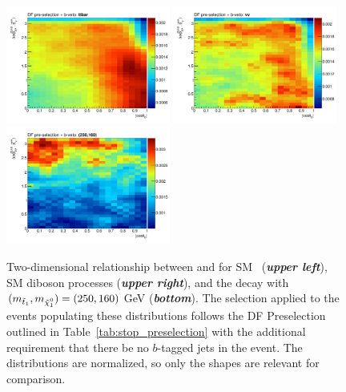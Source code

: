 \begin{figure}[!htb]
    \begin{center}
        \includegraphics[width=0.48\textwidth]{figures/search_stop2l/strategy/corr2d/wwbveto_cosThetaB_DPB_vSS_ttbar_2d}
        \includegraphics[width=0.48\textwidth]{figures/search_stop2l/strategy/corr2d/wwbveto_cosThetaB_DPB_vSS_vv_2d}
        \includegraphics[width=0.48\textwidth]{figures/search_stop2l/strategy/corr2d/wwbveto_cosThetaB_DPB_vSS_bwn250_160_2d}
        \caption{
            Two-dimensional relationship between \dpb and \cosb for SM \ttbar~(\textit{\textbf{upper left}}),
            SM diboson processes (\textit{\textbf{upper right}}), and the \bWN decay with $\msn = (250, 160)$\,GeV
            (\textit{\textbf{bottom}}).
            The selection applied to the events populating these distributions follows the DF Preselection outlined in Table~\ref{tab:stop_preselection}
            with the additional requirement that there be no $b$-tagged jets in the event.
            The distributions are normalized, so only the shapes are relevant for comparison.
        }
        \label{fig:stop_corr2d_bveto}
    \end{center}
\end{figure}

